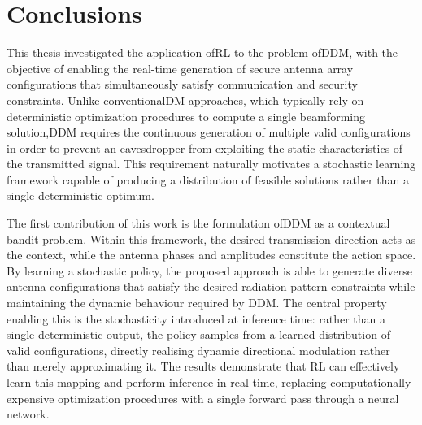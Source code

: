
\chapter{Conclusions}
\label{cap:conclusions}
This thesis investigated the application of\gls{RL} to the problem of\gls{DDM}, with the objective of enabling the real-time generation of secure antenna array configurations that simultaneously satisfy communication and security constraints. Unlike conventional\gls{DM} approaches, which typically rely on deterministic optimization procedures to compute a single beamforming solution,\gls{DDM} requires the continuous generation of multiple valid configurations in order to prevent an eavesdropper from exploiting the static characteristics of the transmitted signal. This requirement naturally motivates a stochastic learning framework capable of producing a distribution of feasible solutions rather than a single deterministic optimum.

The first contribution of this work is the formulation of\gls{DDM} as a contextual bandit problem. Within this framework, the desired transmission direction acts as the context, while the antenna phases and amplitudes constitute the action space. By learning a stochastic policy, the proposed approach is able to generate diverse antenna configurations that satisfy the desired radiation pattern constraints while maintaining the dynamic behaviour required by \gls{DDM}. The central property enabling this is the stochasticity introduced at inference time: rather than a single deterministic output, the policy samples from a learned distribution of valid configurations, directly realising dynamic directional modulation rather than merely approximating it. The results demonstrate that RL can effectively learn this mapping and perform inference in real time, replacing computationally expensive optimization procedures with a single forward pass through a neural network.

